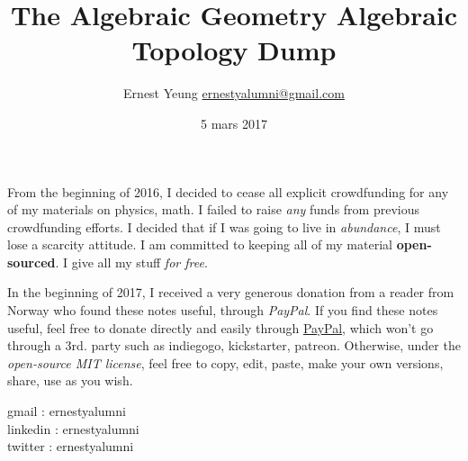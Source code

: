 \documentclass[10pt]{amsart}
\title{The Algebraic Geometry Algebraic Topology Dump}
\author{Ernest Yeung \href{mailto:ernestyalumni@gmail.com}{ernestyalumni@gmail.com}}
\date{5 mars 2017}
\begin{document}

\maketitle

From the beginning of 2016, I decided to cease all explicit crowdfunding for any of my materials on physics, math.  I failed to raise \emph{any} funds from previous crowdfunding efforts.  I decided that if I was going to live in \emph{abundance}, I must lose a scarcity attitude.  I am committed to keeping all of my material \textbf{open-sourced}.  I give all my stuff \emph{for free}.   

In the beginning of 2017, I received a very generous donation from a reader from Norway who found these notes useful, through \emph{PayPal}.  If you find these notes useful, feel free to donate directly and easily through \href{https://www.paypal.com/cgi-bin/webscr?cmd=_donations&business=ernestsaveschristmas%2bpaypal%40gmail%2ecom&lc=US&item_name=ernestyalumni&currency_code=USD&bn=PP%2dDonationsBF%3abtn_donateCC_LG%2egif%3aNonHosted}{PayPal}, which won't go through a 3rd. party such as indiegogo, kickstarter, patreon.  Otherwise, under the \emph{open-source MIT license}, feel free to copy, edit, paste, make your own versions, share, use as you wish.    

\noindent gmail        : ernestyalumni \\
linkedin     : ernestyalumni \\
twitter      : ernestyalumni \\
\end{document}
